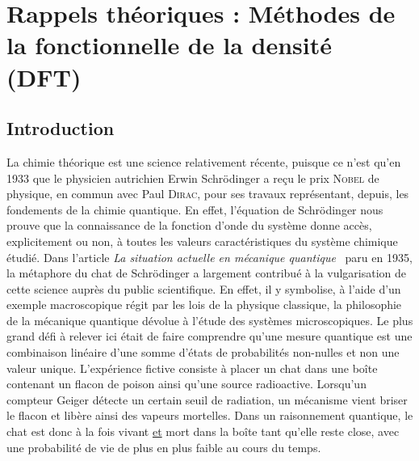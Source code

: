 \chapter[Rappels théoriques : DFT]{Rappels théoriques : Méthodes de la fonctionnelle de la densité (DFT)}
\minitoc
\restoregeometry

\newpage

\section*{Introduction}

La chimie théorique est une science relativement récente, puisque ce n'est qu'en 1933 que le physicien autrichien Erwin Schr\"{o}dinger  a reçu le prix \textsc{Nobel} de physique, en commun avec Paul \textsc{Dirac}, pour ses travaux représentant, depuis, les fondements de la chimie quantique. En effet, l'équation de Schr\"{o}dinger nous prouve que la connaissance de la fonction d'onde du système donne accès, explicitement ou non, à toutes les valeurs caractéristiques du système chimique étudié. Dans l'article \textit{La situation actuelle en mécanique quantique}~\cite{schrodinger1992situation} paru en 1935, la métaphore du  \og chat de Schr\"{o}dinger \fg{} a largement contribué à la vulgarisation de cette science auprès du public scientifique. En effet, il y symbolise, à l'aide d'un exemple macroscopique régit par les lois de la physique classique, la philosophie de la mécanique quantique dévolue à l'étude des systèmes microscopiques. Le plus grand défi à relever ici était de faire comprendre qu'une \og mesure quantique \fg{} est une combinaison linéaire d'une somme d'états de probabilités non-nulles et non une valeur unique. L'expérience fictive consiste à placer un chat dans une boîte contenant un flacon de poison ainsi qu'une source radioactive. Lorsqu'un compteur Geiger détecte un certain seuil de radiation, un mécanisme vient briser le flacon et libère ainsi des vapeurs mortelles. Dans un raisonnement quantique, le chat est donc à la fois vivant \underline{et} mort dans la boîte tant qu'elle reste close, avec une probabilité de vie de plus en plus faible au cours du temps.\\

